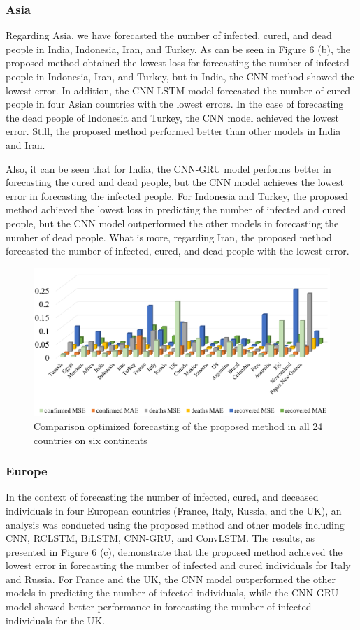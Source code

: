 \documentclass{article}
\begin{document}
\subsubsection{Asia}
Regarding Asia, we have forecasted the number of infected, cured, and dead people in India, Indonesia, Iran, and Turkey. As can be seen in Figure 6 (b), the proposed method obtained the lowest loss for forecasting the number of infected people in Indonesia, Iran, and Turkey, but in India, the CNN method showed the lowest error. In addition, the CNN-LSTM model forecasted the number of cured people in four Asian countries with the lowest errors. In the case of forecasting the dead people of Indonesia and Turkey, the CNN model achieved the lowest error. Still, the proposed method performed better than other models in India and Iran. 

Also, it can be seen that for India, the CNN-GRU model performs better in forecasting the cured and dead people, but the CNN model achieves the lowest error in forecasting the infected people. For Indonesia and Turkey, the proposed method achieved the lowest loss in predicting the number of infected and cured people, but the CNN model outperformed the other models in forecasting the number of dead people. What is more, regarding Iran, the proposed method forecasted the number of infected, cured, and dead people with the lowest error.
\begin{figure}
	\centering
	\includegraphics [width=6.2 in] {FinalRes.PNG}
	\caption{Comparison optimized forecasting of the proposed method in all 24 countries on six continents}
	\label{figOveall}
\end{figure}
\subsubsection{Europe}
In the context of forecasting the number of infected, cured, and deceased individuals in four European countries (France, Italy, Russia, and the UK), an analysis was conducted using the proposed method and other models including CNN, RCLSTM, BiLSTM, CNN-GRU, and ConvLSTM. The results, as presented in Figure 6 (c), demonstrate that the proposed method achieved the lowest error in forecasting the number of infected and cured individuals for Italy and Russia. For France and the UK, the CNN model outperformed the other models in predicting the number of infected individuals, while the CNN-GRU model showed better performance in forecasting the number of infected individuals for the UK.
\end{document}
